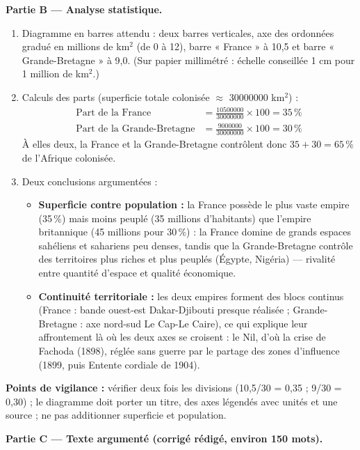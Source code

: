 \documentclass[11pt]{article}
\begin{document}
\begin{corrige}
\textbf{Partie B — Analyse statistique.}
\begin{enumerate}
    \item Diagramme en barres attendu : deux barres verticales, axe des ordonnées gradué en millions de km$^2$ (de 0 à 12), barre « France » à 10,5 et barre « Grande-Bretagne » à 9,0. (Sur papier millimétré : échelle conseillée 1 cm pour 1 million de km$^2$.)
    \item Calculs des parts (superficie totale colonisée $\approx$ \num{30000000} km$^2$) :
    \begin{align*}
    \text{Part de la France} &= \frac{\num{10500000}}{\num{30000000}} \times 100 = 35\,\% \\
    \text{Part de la Grande-Bretagne} &= \frac{\num{9000000}}{\num{30000000}} \times 100 = 30\,\%
    \end{align*}
    À elles deux, la France et la Grande-Bretagne contrôlent donc $35 + 30 = 65\,\%$ de l'Afrique colonisée.
    \item Deux conclusions argumentées :
    \begin{itemize}
        \item \textbf{Superficie contre population :} la France possède le plus vaste empire (35\,\%) mais moins peuplé (35 millions d'habitants) que l'empire britannique (45 millions pour 30\,\%) : la France domine de grands espaces sahéliens et sahariens peu denses, tandis que la Grande-Bretagne contrôle des territoires plus riches et plus peuplés (Égypte, Nigéria) — rivalité entre quantité d'espace et qualité économique.
        \item \textbf{Continuité territoriale :} les deux empires forment des blocs continus (France : bande ouest-est Dakar-Djibouti presque réalisée ; Grande-Bretagne : axe nord-sud Le Cap-Le Caire), ce qui explique leur affrontement là où les deux axes se croisent : le Nil, d'où la crise de Fachoda (1898), réglée sans guerre par le partage des zones d'influence (1899, puis Entente cordiale de 1904).
    \end{itemize}
\end{enumerate}
\textbf{Points de vigilance :} vérifier deux fois les divisions (10,5/30 = 0,35 ; 9/30 = 0,30) ; le diagramme doit porter un titre, des axes légendés avec unités et une source ; ne pas additionner superficie et population.

\textbf{Partie C — Texte argumenté (corrigé rédigé, environ 150 mots).}


\end{corrige}
\end{document}
